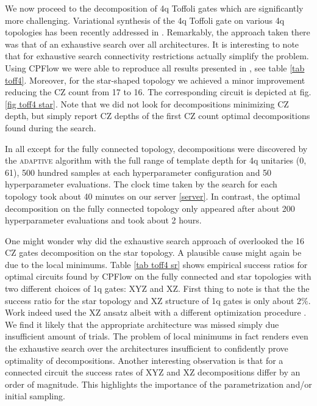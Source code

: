\documentclass[twocolumn, amsfonts, amssymb, aps, nofootinbib]{revtex4-2}
\newcommand{\CZ}{CZ }
\newcommand{\package}[1]{\textrm {#1 }}
\newcommand{\cpflow}{\package{CPFlow}}
\newcommand{\adaptive}{\textsc{adaptive }}
\begin{document}
We now proceed to the decomposition of 4q Toffoli gates which are significantly more challenging. Variational synthesis of the 4q Toffoli gate on various 4q topologies has been recently addressed in \cite{Nakanishi2021}. Remarkably, the approach taken there was that of an exhaustive search over all architectures. It is interesting to note that for exhaustive search connectivity restrictions actually simplify the problem. Using \cpflow we were able to reproduce all results presented in \cite{Nakanishi2021}, see table \ref{tab toff4}. Moreover, for the star-shaped topology we achieved a minor improvement reducing the \CZ count from 17 to 16. The corresponding circuit is depicted at fig.\ref{fig toff4 star}. Note that we did not look for decompositions minimizing \CZ depth, but simply report \CZ depths of the first \CZ count optimal decompositions found during the search.

In all except for the fully connected topology, decompositions were discovered by the \adaptive algorithm with the full range of template depth for 4q unitaries (0, 61), 500 hundred samples at each hyperparameter configuration and 50 hyperparameter evaluations. The clock time taken by the search for each topology took about 40 minutes on our server \ref{server}. In contrast, the optimal decomposition on the fully connected topology only appeared after about 200 hyperparameter evaluations and took about 2 hours.

One might wonder why did the exhaustive search approach of \cite{Nakanishi2021} overlooked the 16 \CZ gates decomposition on the star topology. A plausible cause might again be due to the local minimums. Table \ref{tab toff4 sr} shows empirical success ratios for optimal circuits found by \cpflow on the fully connected and star topologies with two different choices of 1q gates: XYZ and XZ. First thing to note is that the the success ratio for the star topology and XZ structure of 1q gates is only about $2\%$. Work \cite{Nakanishi2021} indeed used the XZ ansatz albeit with a different optimization procedure \cite{Nakanishi2020}. We find it likely that the appropriate architecture was missed simply due insufficient amount of trials. The problem of local minimums in fact renders even the exhaustive search over the architectures insufficient to confidently  prove optimality of decompositions. Another interesting observation is that for a connected circuit the success rates of XYZ and XZ decompositions differ by an order of magnitude. This highlights the importance of the parametrization and/or initial sampling. 
\end{document}
